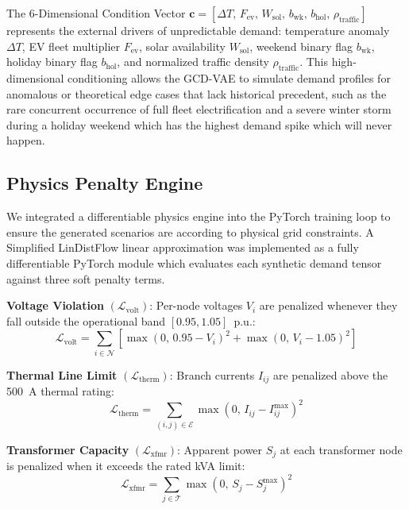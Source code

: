 \documentclass[conference]{IEEEtran}
\begin{document}
The 6-Dimensional Condition Vector $\mathbf{c} = [\Delta T,\, F_{\text{ev}},\, W_{\text{sol}},\, b_{\text{wk}},\, b_{\text{hol}},\, \rho_{\text{traffic}}]$ represents the external drivers of unpredictable demand: temperature anomaly $\Delta T$, EV fleet multiplier $F_{\text{ev}}$, solar availability $W_{\text{sol}}$, weekend binary flag $b_{\text{wk}}$, holiday binary flag $b_{\text{hol}}$, and normalized traffic density $\rho_{\text{traffic}}$. This high-dimensional conditioning allows the GCD-VAE to simulate demand profiles for anomalous or theoretical edge cases that lack historical precedent, such as the rare concurrent occurrence of full fleet electrification and a severe winter storm during a holiday weekend which has the highest demand spike which will never happen.


\subsection{Physics Penalty Engine}

We integrated a differentiable physics engine into the PyTorch training loop to ensure the generated scenarios are according to physical grid constraints. A Simplified LinDistFlow linear approximation was implemented as a fully differentiable PyTorch module which evaluates each synthetic demand tensor against three soft penalty terms.

\textbf{Voltage Violation} $(\mathcal{L}_{\text{volt}})$: Per-node voltages $V_i$ are penalized whenever they fall outside the operational band $[0.95, 1.05]$~p.u.:
\begin{equation}
    \mathcal{L}_{\text{volt}} = \sum_{i \in \mathcal{N}} \left[\max(0,\, 0.95 - V_i)^2 + \max(0,\, V_i - 1.05)^2\right]
\end{equation}

\textbf{Thermal Line Limit} $(\mathcal{L}_{\text{therm}})$: Branch currents $I_{ij}$ are penalized above the 500~A thermal rating:
\begin{equation}
    \mathcal{L}_{\text{therm}} = \sum_{(i,j)\in\mathcal{E}} \max(0,\, I_{ij} - I_{ij}^{\max})^2
\end{equation}

\textbf{Transformer Capacity} $(\mathcal{L}_{\text{xfmr}})$: Apparent power $S_j$ at each transformer node is penalized when it exceeds the rated kVA limit:
\begin{equation}
    \mathcal{L}_{\text{xfmr}} = \sum_{j \in \mathcal{T}} \max(0,\, S_j - S_j^{\max})^2
\end{equation}
\end{document}
